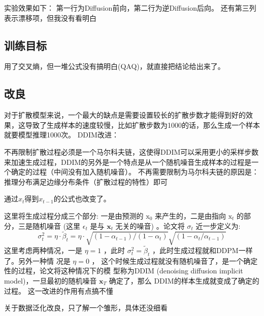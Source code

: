 \documentclass[]{ctexart}
\begin{document}
实验效果如下：
第一行为Diffusion前向，第二行为逆Diffusion后向。
还有第三列表示漂移项，但我没有看明白

\subsection{训练目标}

用了交叉熵，但一堆公式没有搞明白(QAQ)，就直接把结论给出来了。

\subsection{改良}
对于扩散模型来说，一个最大的缺点是需要设置较长的扩散步数才能得到好的效果，这导致了生成样本的速度较慢，比如扩散步数为1000的话，那么生成一个样本就要模型推理1000次。
DDIM改进：

不再限制扩散过程必须是一个马尔科夫链，这使得DDIM可以采用更小的采样步数来加速生成过程，DDIM的另外是一个特点是从一个随机噪音生成样本的过程是一个确定的过程（中间没有加入随机噪音）。
不再需要限制为马尔科夫链的原因是：
推理分布满足边缘分布条件（扩散过程的特性）即可

通过$x_t$得到$x_{t-1}$的公式也改变了。

这里将生成过程分成三个部分: 一是由预测的 $\mathrm{x}_0$ 来产生的，二是由指向 $\mathrm{x}_t$ 的部分，三是随机噪音 (这里 $\epsilon_t$ 是与 $\mathbf{x}_t$ 无关的噪音) 。论文将 $\sigma_t$ 近一步定义为:
$$
\sigma_t^2=\eta \cdot \tilde{\beta}_t=\eta \cdot \sqrt{\left(1-\alpha_{t-1}\right) /\left(1-\alpha_t\right)} \sqrt{\left(1-\alpha_t / \alpha_{t-1}\right)}
$$
这里考虑两种情况，一是 $\eta=1$ ，此时 $\sigma_t^2=\tilde{\beta}_t$ ，此时生成过程就和DDPM一样了。另外一种情 况是 $\eta=0$ ，
这个时候生成过程就没有随机噪音了，是一个确定性的过程，论文将这种情况下的模 型称为DDIM (denoising diffusion implicit model)，一旦最初的随机噪音 $\mathbf{x}_T$ 确定了，那么 DDIM的样本生成就变成了确定的过程。
这一改进的作用有点搞不懂

关于数据泛化改良，只了解一个雏形，具体还没细看
\end{document}

